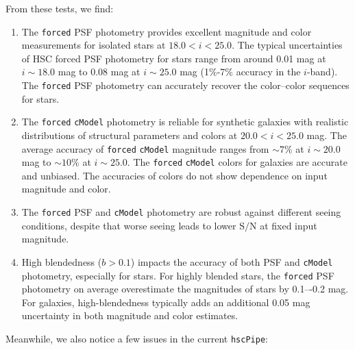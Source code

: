 \documentclass[useamsfonts]{pasj01}
\def\hscpipe{\texttt{hscPipe}}
\def\cmodel{\texttt{cModel}}
\def\forced{\texttt{forced}}
\begin{document}
    From these tests, we find:

    \begin{enumerate}

        \item The \forced{} PSF photometry provides excellent magnitude and color
            measurements for isolated stars at $18.0 < i < 25.0$.
            The typical uncertainties of HSC forced PSF photometry for stars range
            from around 0.01 mag at $i{\sim}18.0$ mag to 0.08 mag at $i{\sim}25.0$
            mag (1\%-7\% accuracy in the $i$-band).
            The \forced{} PSF photometry can accurately recover the color--color
            sequences for stars.

        \item The \forced{} \cmodel{} photometry is reliable for synthetic galaxies
            with realistic distributions of structural parameters and colors at
            $20.0 < i < 25.0$ mag.
            The average accuracy of \forced{} \cmodel{} magnitude ranges from
            ${\sim}7$\% at $i{\sim}20.0$ mag to ${\sim}10$\% at $i{\sim}25.0$.
            The \forced{} \cmodel{} colors for galaxies are accurate and unbiased.
            The accuracies of colors do not show dependence on input magnitude and
            color.

        \item The \forced{} PSF and \cmodel{} photometry are robust against different
            seeing conditions, despite that worse seeing leads to lower
            $\mathrm{S}/\mathrm{N}$ at fixed input magnitude.

        \item High blendedness ($b>0.1$) impacts the accuracy of both PSF and \cmodel{}
            photometry, especially for stars.
            For highly blended stars, the \forced{} PSF photometry on average
            overestimate the magnitudes of stars by 0.1–-0.2 mag.
            For galaxies, high-blendedness typically adds an additional 0.05 mag
            uncertainty in both magnitude and color estimates.

    \end{enumerate}

    Meanwhile, we also notice a few issues in the current \hscpipe{}:
\end{document}
